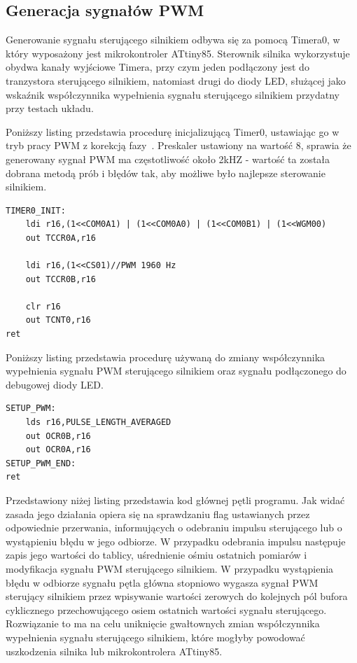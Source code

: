 \subsection{Generacja sygnałów PWM}

Generowanie sygnału sterującego silnikiem odbywa się za pomocą Timera0, w który wyposażony jest mikrokontroler ATtiny85. Sterownik silnika wykorzystuje obydwa kanały wyjściowe Timera, przy czym jeden podłączony jest do tranzystora sterującego silnikiem, natomiast drugi do diody LED, służącej jako wskaźnik współczynnika wypełnienia sygnału sterującego silnikiem przydatny przy testach układu. 

Poniższy listing przedstawia procedurę inicjalizującą Timer0, ustawiając go w tryb pracy PWM z korekcją fazy~\cite{ds_attiny85}. Preskaler ustawiony na wartość 8, sprawia że generowany sygnał PWM ma częstotliwość około 2kHZ - wartość ta została dobrana metodą prób i błędów tak, aby możliwe było najlepsze sterowanie silnikiem. 

\begin{lstlisting}
TIMER0_INIT:
	ldi r16,(1<<COM0A1) | (1<<COM0A0) | (1<<COM0B1) | (1<<WGM00)
	out TCCR0A,r16

	ldi r16,(1<<CS01)//PWM 1960 Hz
	out TCCR0B,r16

	clr r16
	out TCNT0,r16
ret
\end{lstlisting}


Poniższy listing przedstawia procedurę używaną do zmiany współczynnika wypełnienia sygnału PWM sterującego silnikiem oraz sygnału podłączonego do debugowej diody LED.

\begin{lstlisting}
SETUP_PWM:
	lds r16,PULSE_LENGTH_AVERAGED
	out OCR0B,r16
	out OCR0A,r16
SETUP_PWM_END:
ret
\end{lstlisting}


Przedstawiony niżej listing przedstawia kod głównej pętli programu. Jak widać zasada jego działania opiera się na sprawdzaniu flag ustawianych przez odpowiednie przerwania, informujących o odebraniu impulsu sterującego lub o wystąpieniu błędu w jego odbiorze. W przypadku odebrania impulsu następuje zapis jego wartości do tablicy, uśrednienie ośmiu ostatnich pomiarów i modyfikacja sygnału PWM sterującego silnikiem. W przypadku wystąpienia błędu w odbiorze sygnału pętla główna stopniowo wygasza sygnał PWM sterujący silnikiem przez wpisywanie wartości zerowych do kolejnych pól bufora cyklicznego przechowującego osiem ostatnich wartości sygnału sterującego. Rozwiązanie to ma na celu uniknięcie gwałtownych zmian współczynnika wypełnienia sygnału sterującego silnikiem, które mogłyby powodować uszkodzenia silnika lub mikrokontrolera ATtiny85.

